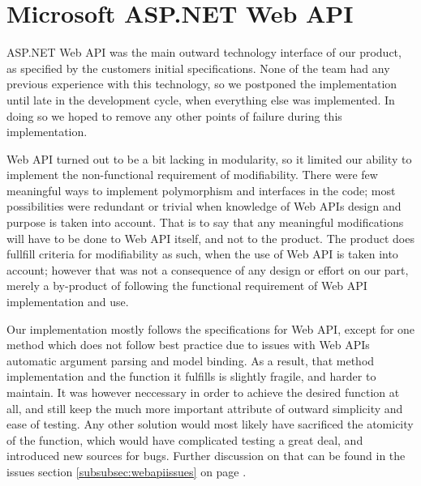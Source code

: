 \section{Microsoft ASP.NET Web API}
\label{subsec:webapiimpl}

ASP.NET Web API was the main outward technology interface of our product, as specified by the customers initial specifications. None of the team had any previous experience
with this technology, so we postponed the implementation until late in the development cycle, when everything else was implemented. In doing so we hoped to remove any other points
of failure during this implementation.

Web API turned out to be a bit lacking in modularity, so it limited our ability to implement the non-functional requirement of modifiability. There were few meaningful ways to implement
polymorphism and interfaces in the code; most possibilities were redundant or trivial when knowledge of Web APIs design and purpose is taken into account. That is to say that any meaningful
modifications will have to be done to Web API itself, and not to the product. The product does fullfill criteria for modifiability as such, when the use of Web API is taken into account;
however that was not a consequence of any design or effort on our part, merely a by-product of following the functional requirement of Web API implementation and use.

Our implementation mostly follows the specifications for Web API, except for one method which does not follow best practice due to issues with Web APIs automatic argument parsing and model binding.
As a result, that method implementation and the function it fulfills is slightly fragile, and harder to maintain. It was however neccessary in order to achieve the desired function at all, and still
keep the much more important attribute of outward simplicity and ease of testing. Any other solution would most likely have sacrificed the atomicity of the function, which would have complicated testing a great deal, and introduced new sources for bugs. Further discussion on that can be found in the issues section \ref{subsubsec:webapiissues} on page \pageref{subsubsec:webapiissues}.
